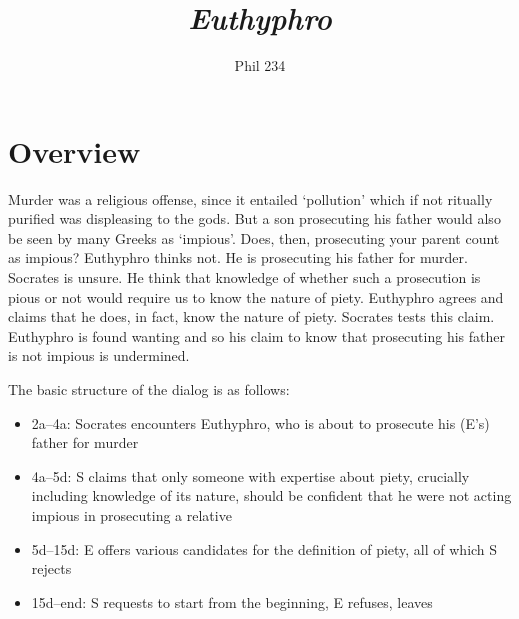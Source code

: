 \documentclass[10 pt]{article}
\begin{document}
\author{Phil 234}
\title{\emph{Euthyphro}}
\maketitle


\section*{Overview}

Murder was a religious offense, since it entailed `pollution' which if not ritually purified was displeasing to the gods. But a son prosecuting his father would also be seen by many Greeks as `impious'. Does, then, prosecuting your parent count as impious? Euthyphro thinks not. He is prosecuting his father for murder.  Socrates is unsure. He think that knowledge of whether such a prosecution is pious or not would require us to know the nature of piety. Euthyphro agrees and claims that he does, in fact, know the nature of piety. Socrates tests this claim. Euthyphro  is found wanting and so his claim to know that prosecuting his father is not impious is undermined. 

The basic structure of the dialog is as follows: 
\begin{itemize}\item{2a--4a: Socrates encounters Euthyphro, who is about to prosecute his (E's) father for murder}\item{4a--5d: S claims that only someone with expertise about piety, crucially including knowledge of its nature, should be confident that he were not acting impious in prosecuting a relative}\item{5d--15d: E offers various candidates for the definition of piety, all of which S rejects}\item{15d--end: S requests to start from the beginning, E refuses, leaves}\end{itemize}



\end{document}
